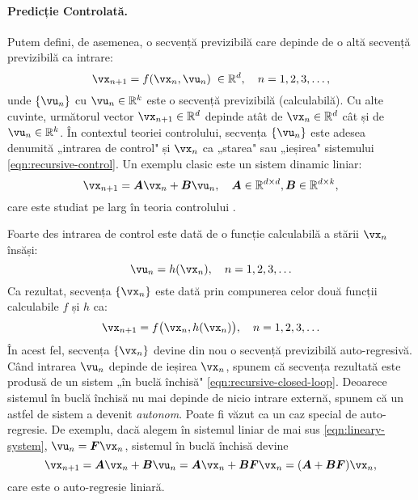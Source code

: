 \documentclass[../../book-main_ro.tex]{subfiles}
\begin{document}
\paragraph{Predicție Controlată.}
Putem defini, de asemenea, o secvență previzibilă care depinde de o altă secvență previzibilă ca intrare:
\begin{equation}
    \vx_{n+1} = f(\vx_{n}, \vu_n) \; \in \mathbb{R}^d, \quad n =  1, 2, 3, \ldots,
\label{eqn:recursive-control}
\end{equation}
unde $\{\vu_n\}$ cu $\vu_n \in \mathbb{R}^k$ este o secvență previzibilă (calculabilă). Cu alte cuvinte, următorul vector $\vx_{n+1} \in \mathbb{R}^d$ depinde atât de $\vx_n \in \mathbb{R}^d$ cât și de $\vu_n \in \mathbb{R}^k$. În contextul teoriei controlului, secvența $\{\vu_n\}$ este adesea denumită „intrarea de control" și $\vx_n$ ca „starea" sau „ieșirea" sistemului \eqref{eqn:recursive-control}. Un exemplu clasic este un sistem dinamic liniar:
\begin{equation}
    \vx_{n+1} = \boldsymbol{A}\vx_n + \boldsymbol{B}\vu_n, \quad \boldsymbol{A} \in \mathbb{R}^{d\times d}, \boldsymbol{B} \in \mathbb{R}^{d\times k},
    \label{eqn:lineary-system}
\end{equation}
care este studiat pe larg în teoria controlului \cite{Cal:Des}.

Foarte des intrarea de control este dată de o funcție calculabilă a stării $\vx_n$ însăși:
\begin{equation}
    \vu_n = h(\vx_n), \quad n =  1, 2, 3, \ldots
\end{equation}
Ca rezultat, secvența $\{\vx_n\}$ este dată prin compunerea celor două funcții calculabile $f$ și $h$ ca:
\begin{equation}
    \vx_{n+1} = f\big(\vx_{n}, h(\vx_n)\big), \quad n =  1, 2, 3, \ldots
    \label{eqn:recursive-closed-loop}
\end{equation}
În acest fel, secvența $\{\vx_n\}$ devine din nou o secvență previzibilă auto-regresivă. Când intrarea $\vu_n$ depinde de ieșirea $\vx_n$, spunem că secvența rezultată este produsă de un sistem „în buclă închisă" \eqref{eqn:recursive-closed-loop}. Deoarece sistemul în buclă închisă nu mai depinde de nicio intrare externă, spunem că un astfel de sistem a devenit {\em autonom}. Poate fi văzut ca un caz special de auto-regresie. De exemplu, dacă alegem în sistemul liniar de mai sus \eqref{eqn:lineary-system}, $\vu_n = \boldsymbol{F}\vx_n$, sistemul în buclă închisă devine
\begin{equation}
        \vx_{n+1} = \boldsymbol{A}\vx_n + \boldsymbol{B}\vu_n = \boldsymbol{A}\vx_n + \boldsymbol{B}\boldsymbol{F}\vx_n = (\boldsymbol{A}+ \boldsymbol{B}\boldsymbol{F})\vx_n,
    \label{eqn:lineary-system-closed}
\end{equation}
care este o auto-regresie liniară.
\end{document}
